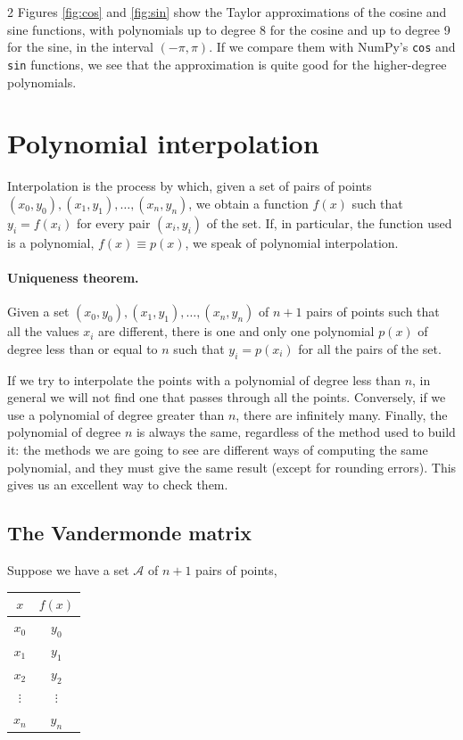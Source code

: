 \begin{paracol}{2}
\switchcolumn
Figures \ref{fig:cos} and \ref{fig:sin} show the Taylor approximations of the cosine and sine functions, with polynomials up to degree 8 for the cosine and up to degree 9 for the sine, in the interval $(-\pi, \pi)$. If we compare them with NumPy's \texttt{cos} and \texttt{sin} functions, we see that the approximation is quite good for the higher-degree polynomials.

\section{Polynomial interpolation}
Interpolation is the process by which, given a set of pairs of points $(x_0,y_0),(x_1,y_1), \dots, (x_n,y_n)$, we obtain a function $f(x)$ such that $y_i = f(x_i)$ for every pair $(x_i,y_i)$ of the set. If, in particular, the function used is a polynomial, $f(x)\equiv p(x)$, we speak of polynomial interpolation. 

\paragraph{Uniqueness theorem.}
Given a set $(x_0,y_0),(x_1,y_1),\dots, (x_n,y_n)$ of $n+1$ pairs of points such that all the values $x_i$ are different, there is one and only one polynomial $p(x)$ of degree less than or equal to $n$ such that $y_i=p(x_i)$ for all the pairs of the set.

If we try to interpolate the points with a polynomial of degree less than $n$, in general we will not find one that passes through all the points. Conversely, if we use a polynomial of degree greater than $n$, there are infinitely many. Finally, the polynomial of degree $n$ is always the same, regardless of the method used to build it: the methods we are going to see are different ways of computing the same polynomial, and they must give the same result (except for rounding errors). This gives us an excellent way to check them.

\subsection{The Vandermonde matrix}
Suppose we have a set $\mathcal{A}$ of $n+1$ pairs of points,
\end{paracol}
\begin{table}[h]
\centering
\begin{tabular}{c|c}
$x$&$f(x)$\\
\hline
$x_0$& $y_0$\\
$x_1$&$y_1$\\
$x_2$&$y_2$\\
$\vdots$&$\vdots$\\
$x_n$&$y_n$
\end{tabular}
\label{tpuntos3}
\end{table}
